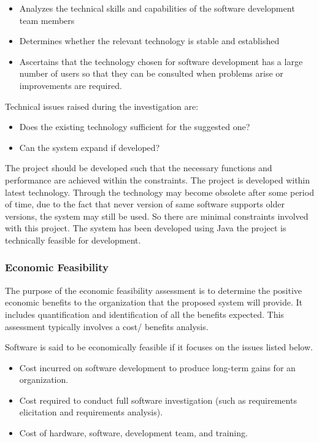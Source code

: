 \begin{itemize}
	\item Analyzes the technical skills and capabilities of the software development team members
	\item Determines whether the relevant technology is stable and established
	\item Ascertains that the technology chosen for software development has a large number of users so that they can be consulted when problems arise or improvements are required.
\end{itemize}

Technical issues raised during the investigation are:
\begin{itemize}
	\item Does the existing technology sufficient for the suggested one?
	\item Can the system expand if developed?
\end{itemize}

The project should be developed such that the necessary functions and performance are achieved within the constraints. The project is developed within latest technology. Through the technology may become obsolete after some period of time, due to the fact that never version of same software supports older versions, the system may still be used. So there are minimal constraints involved with this project. The system has been developed using Java the project is technically feasible for development.

\subsubsection{Economic Feasibility}
The purpose of the economic feasibility assessment is to determine the positive economic benefits to the organization that the proposed system will provide. It includes quantification and identification of all the benefits expected. This assessment typically involves a cost/ benefits analysis.

Software is said to be economically feasible if it focuses on the issues listed below.
\begin{itemize}
	\item Cost incurred on software development to produce long-term gains for an organization.
	\item Cost required to conduct full software investigation (such as requirements elicitation and requirements analysis).
	\item Cost of hardware, software, development team, and training.
\end{itemize}

